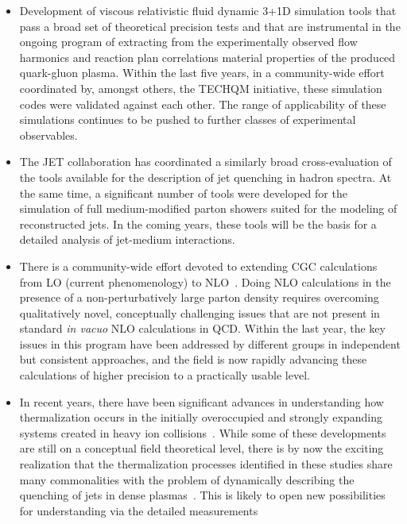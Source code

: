 \begin{itemize}
\item Development of viscous relativistic fluid dynamic 3+1D simulation tools that pass a broad set of 
theoretical precision tests and that are instrumental in the ongoing program of extracting from the 
experimentally observed flow harmonics and reaction plan correlations material properties of the produced  
quark-gluon plasma. Within the last five years, in a community-wide effort coordinated by, amongst others,
the TECHQM\cite{TECHQM} initiative, these simulation codes were validated against each other. The range of
applicability of these simulations continues to be pushed to further classes of experimental observables.
\item The JET collaboration\cite{JET} has coordinated a similarly broad cross-evaluation of the tools available
for the description of jet quenching in hadron spectra. At the same time, a significant number of 
tools were developed for the simulation of full medium-modified parton showers suited for the modeling
of reconstructed jets. In the coming years, these tools will be the basis for a detailed analysis of jet-medium
interactions.  
\item There is a community-wide effort devoted to extending CGC calculations from LO
 (current phenomenology) to 
NLO~\cite{Balitsky:2008zza,Chirilli:2011km,Stasto:2013cha,Beuf:2014uia,Kang:2014lha}.
Doing NLO calculations in the presence of a non-perturbatively large parton density requires overcoming
qualitatively novel, conceptually challenging issues that are not present in standard {\em in vacuo} NLO calculations in QCD. Within the last
year, the key issues in this program have been addressed by different groups in independent but consistent
approaches, and the field is now rapidly  advancing these calculations of higher precision to a practically
usable level. 
\item In recent years, there have been significant advances in understanding how thermalization occurs in the
initially overoccupied and strongly expanding systems created in heavy ion collisions~\cite{Berges:2013eia,Gelis:2013rba,Kurkela:2014tea}. While some of these
developments are still on a conceptual field theoretical level, there is by now the exciting realization that the thermalization
processes identified in these studies share many commonalities with the problem of dynamically describing the
quenching of jets in dense plasmas~\cite{Blaizot:2013hx,Kurkela:2014tla}. This is likely to open new possibilities for understanding via the detailed measurements

\end{itemize}
